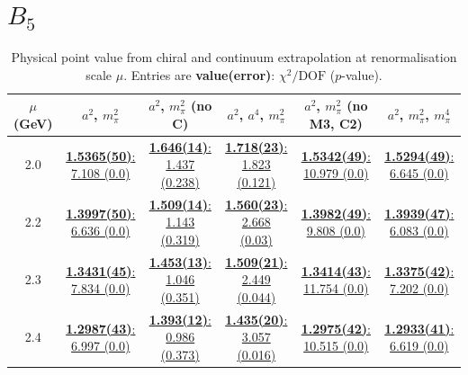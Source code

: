 \documentclass[12pt]{extarticle}
\begin{document}
\section{$B_5$}
\begin{table}[h!]
\begin{center}
\begin{tabular}{|c|c|c|c|c|c|}
\hline
$\mu$ (GeV) & $a^2$, $m_\pi^2$& $a^2$, $m_\pi^2$ (no C)& $a^2$, $a^4$, $m_\pi^2$& $a^2$, $m_\pi^2$ (no M3, C2)& $a^2$, $m_\pi^2$, $m_\pi^4$\\
\hline
2.0& \hyperlink{TT/NPR/a2m2_20.pdf.1}{\textbf{1.5365(50)}: 7.108 (0.0)} & \hyperlink{TT/NPR/a2m2noC_20.pdf.1}{\textbf{1.646(14)}: 1.437 (0.238)} & \hyperlink{TT/NPR/a2a4m2_20.pdf.1}{\textbf{1.718(23)}: 1.823 (0.121)} & \hyperlink{TT/NPR/a2m2mcut_20.pdf.1}{\textbf{1.5342(49)}: 10.979 (0.0)} & \hyperlink{TT/NPR/a2m2m4_20.pdf.1}{\textbf{1.5294(49)}: 6.645 (0.0)}\\
2.2& \hyperlink{TT/NPR/a2m2_22.pdf.1}{\textbf{1.3997(50)}: 6.636 (0.0)} & \hyperlink{TT/NPR/a2m2noC_22.pdf.1}{\textbf{1.509(14)}: 1.143 (0.319)} & \hyperlink{TT/NPR/a2a4m2_22.pdf.1}{\textbf{1.560(23)}: 2.668 (0.03)} & \hyperlink{TT/NPR/a2m2mcut_22.pdf.1}{\textbf{1.3982(49)}: 9.808 (0.0)} & \hyperlink{TT/NPR/a2m2m4_22.pdf.1}{\textbf{1.3939(47)}: 6.083 (0.0)}\\
2.3& \hyperlink{TT/NPR/a2m2_23.pdf.1}{\textbf{1.3431(45)}: 7.834 (0.0)} & \hyperlink{TT/NPR/a2m2noC_23.pdf.1}{\textbf{1.453(13)}: 1.046 (0.351)} & \hyperlink{TT/NPR/a2a4m2_23.pdf.1}{\textbf{1.509(21)}: 2.449 (0.044)} & \hyperlink{TT/NPR/a2m2mcut_23.pdf.1}{\textbf{1.3414(43)}: 11.754 (0.0)} & \hyperlink{TT/NPR/a2m2m4_23.pdf.1}{\textbf{1.3375(42)}: 7.202 (0.0)}\\
2.4& \hyperlink{TT/NPR/a2m2_24.pdf.1}{\textbf{1.2987(43)}: 6.997 (0.0)} & \hyperlink{TT/NPR/a2m2noC_24.pdf.1}{\textbf{1.393(12)}: 0.986 (0.373)} & \hyperlink{TT/NPR/a2a4m2_24.pdf.1}{\textbf{1.435(20)}: 3.057 (0.016)} & \hyperlink{TT/NPR/a2m2mcut_24.pdf.1}{\textbf{1.2975(42)}: 10.515 (0.0)} & \hyperlink{TT/NPR/a2m2m4_24.pdf.1}{\textbf{1.2933(41)}: 6.619 (0.0)}\\
\hline
\end{tabular}
\caption{Physical point value from chiral and continuum extrapolation at renormalisation scale $\mu$. Entries are \textbf{value(error)}: $\chi^2/\text{DOF}$ ($p$-value).}
\end{center}
\end{table}
\end{document}
